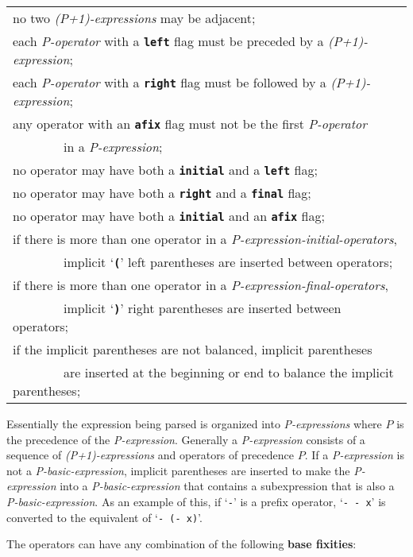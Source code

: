 \documentclass[12pt]{article}
\newcommand{\TT}[1]{{\tt \bfseries #1}}
\newcommand{\key}[1]{{\rm \bfseries #1}}
\newenvironment{indpar}[1][0.3in]%
	{\begin{list}{}%
		     {\setlength{\itemsep}{0in}%
		      \setlength{\topsep}{0in}%
		      \setlength{\parsep}{1ex}%
		      \setlength{\labelwidth}{#1}%
		      \setlength{\leftmargin}{#1}%
		      \addtolength{\leftmargin}{\labelsep}}%
	 \item}%
	{\end{list}}
\begin{document}
\begin{indpar}
\begin{tabular}[t]{l}
       no two {\em (P+1)-expressions} may be adjacent; \\ 
       each {\em P-operator} with a \TT{left} flag must be
              preceded by a {\em (P+1)-expression}; \\
       each {\em P-operator} with a \TT{right} flag must be
	  followed by a {\em (P+1)-expression}; \\
       any operator with an \TT{afix} flag must not be the first
           {\em P-operator} \\
       ~~~~~~~~in a {\em P-expression}; \\
       no operator may have both a \TT{initial} and a \TT{left} flag; \\
       no operator may have both a \TT{right} and a \TT{final} flag; \\
       no operator may have both a \TT{initial} and an \TT{afix} flag; \\
       if there is more than one operator in a
           {\em P-expression-initial-operators}, \\
       ~~~~~~~~implicit `\TT{(}' left parentheses are inserted between
                                 operators; \\
       if there is more than one operator in a
           {\em P-expression-final-operators}, \\
       ~~~~~~~~implicit `\TT{)}' right parentheses are inserted between
                                 operators; \\
       if the implicit parentheses are not balanced, implicit parentheses \\
       ~~~~~~~~are inserted at the beginning or end to balance the
               implicit parentheses;
       \end{tabular}
\end{indpar}

Essentially the expression being parsed is organized into {\em P-expressions}
where $P$ is the precedence of the {\em P-expression}.  Generally
a {\em P-expression} consists of a sequence of {\em (P+1)-expressions}
and operators of precedence $P$.
If a {\em P-expression} is not a {\em P-basic-expression}, implicit
parentheses are inserted to make the {\em P-expression} into a
{\em P-basic-expression} that contains a subexpression that is
also a {\em P-basic-expression}.  As an example of this, if `{\tt -}'
is a prefix operator, `{\tt - - x}' is converted to the equivalent
of `{\tt - (- x)}'.

The operators can have any combination of the following \key{base fixities}:
\end{document}
